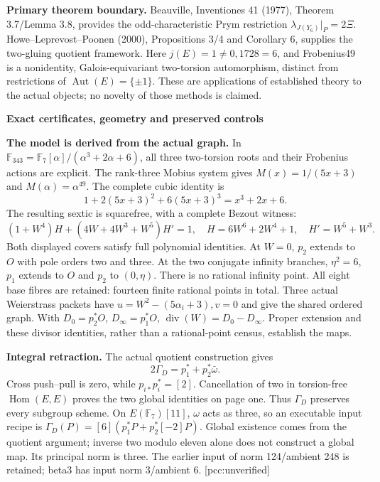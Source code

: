 \documentclass[10pt,a4paper]{article}
\begin{document}
\textbf{Primary theorem boundary.} Beauville, Inventiones 41 (1977),
Theorem 3.7/Lemma 3.8, provides the odd-characteristic Prym restriction
$\lambda_{J(Y_6)}|_P=2\Xi$. Howe--Leprevost--Poonen (2000),
Propositions 3/4 and Corollary 6, supplies the two-gluing quotient
framework. Here $j(E)=1\ne0,1728=6$, and Frobenius49 is a nonidentity,
Galois-equivariant two-torsion automorphism, distinct from restrictions
of $\operatorname{Aut}(E)=\{\pm1\}$. These are applications of established
theory to the actual objects; no novelty of those methods is claimed.

\newpage
{\Large\bfseries Exact certificates, geometry and preserved controls}\par

\textbf{The model is derived from the actual graph.} In
$\mathbb F_{343}=\mathbb F_7[\alpha]/(\alpha^3+2\alpha+6)$, all three
two-torsion roots and their Frobenius actions are explicit. The rank-three
Mobius system gives $M(x)=1/(5x+3)$ and $M(\alpha)=\alpha^{49}$.
The complete cubic identity is
\[
1+2(5x+3)^2+6(5x+3)^3=x^3+2x+6.
\]
The resulting sextic is squarefree, with a complete Bezout witness:
\[
(1+W^4)H+(4W+4W^3+W^5)H'=1,\quad
H=6W^6+2W^4+1,\quad H'=W^5+W^3.
\]
Both displayed covers satisfy full polynomial identities. At $W=0$,
$p_2$ extends to $O$ with pole orders two and three. At the two conjugate
infinity branches, $\eta^2=6$, $p_1$ extends to $O$ and $p_2$ to
$(0,\eta)$. There is no rational infinity point. All eight base fibres
are retained: fourteen finite rational points in total. Three actual
Weierstrass packets have $u=W^2-(5\alpha_i+3),v=0$ and give the shared
ordered graph. With $D_0=p_2^*O$, $D_\infty=p_1^*O$,
$\operatorname{div}(W)=D_0-D_\infty$. Proper extension and these divisor
identities, rather than a rational-point census, establish the maps.

\textbf{Integral retraction.} The actual quotient construction gives
\[
2\Gamma_D=p_1^*+p_2^*\bar\omega.
\]
Cross push--pull is zero, while $p_{i*}p_i^*=[2]$. Cancellation of
two in torsion-free $\operatorname{Hom}(E,E)$ proves the two global
identities on page one. Thus $\Gamma_D$ preserves every subgroup scheme.
On $E(\mathbb F_7)[11]$, $\omega$ acts as three, so an executable input
recipe is $\Gamma_D(P)=[6](p_1^*P+p_2^*[-2]P)$. Global existence comes
from the quotient argument; inverse two modulo eleven alone does not
construct a global map. Its principal norm is three. The earlier input
of norm 124/ambient 248 is retained; beta3 has input norm 3/ambient 6. [pcc:unverified]
\end{document}

